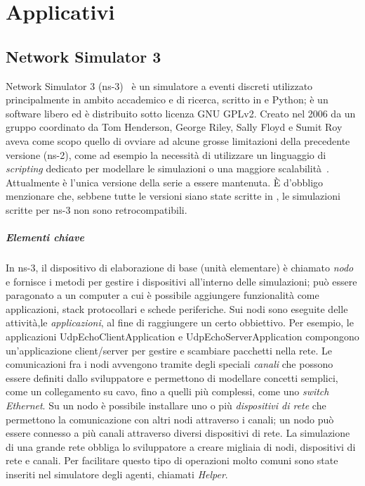
\chapter{Applicativi}\label{chap:applicativi}
\section{Network Simulator 3}\label{sec:ns-3}
Network Simulator 3 (ns-3)~\cite{ns3Website} è un simulatore a eventi discreti utilizzato principalmente in ambito accademico e di ricerca,
scritto in \Cpp{} e Python; è un software libero ed è distribuito sotto licenza GNU GPLv2.
Creato nel 2006 da un gruppo coordinato da Tom Henderson, George Riley, Sally Floyd e Sumit Roy
aveva come scopo quello di ovviare ad alcune grosse limitazioni della precedente versione (ns-2), come ad esempio la necessità di utilizzare
un linguaggio di \textit{scripting} dedicato per modellare le simulazioni o una maggiore scalabilità~\cite{Henderson:2006:NPG:1190455.1190468}.
Attualmente è l'unica versione della serie a essere mantenuta.
È d'obbligo menzionare che, sebbene tutte le versioni siano state scritte in \Cpp,
le simulazioni scritte per ns-3 non sono retrocompatibili.
%
%
\paragraph{Elementi chiave}
In ns-3, il dispositivo di elaborazione di base (unità elementare) è chiamato \textit{nodo}
e fornisce i metodi per gestire i dispositivi all'interno delle simulazioni;
può essere paragonato a un computer a cui è possibile aggiungere funzionalità come applicazioni,
stack protocollari e schede periferiche.
Sui nodi sono eseguite delle attività,le \textit{applicazioni}, al fine di raggiungere un certo obbiettivo.
Per esempio, le applicazioni \textsf{UdpEchoClientApplication} e \textsf{UdpEchoServerApplication} compongono
un'applicazione client/server per gestire e scambiare pacchetti nella rete.
Le comunicazioni fra i nodi avvengono tramite degli speciali \textit{canali}
che possono essere definiti dallo sviluppatore e permettono di modellare concetti semplici, come un collegamento su cavo,
fino a quelli più complessi, come uno \textit{switch Ethernet}.
Su un nodo è possibile installare uno o più \textit{dispositivi di rete} che permettono la comunicazione con altri nodi attraverso i canali;
un nodo può essere connesso a più canali attraverso diversi dispositivi di rete.
La simulazione di una grande rete obbliga lo sviluppatore a creare migliaia di nodi, dispositivi di rete e canali.
Per facilitare questo tipo di operazioni molto comuni sono state inseriti nel simulatore degli agenti, chiamati \textit{Helper}.
%
